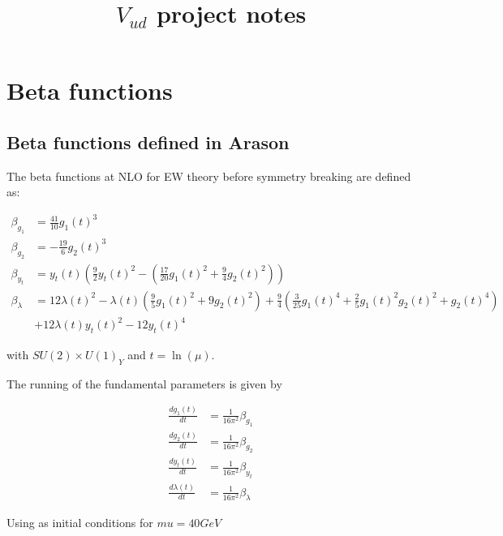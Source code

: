\documentclass[12pt]{article}
\title{$V_{ud}$ project notes}
\author{}
\date{}
\begin{document}
\maketitle

\section{Beta functions}
\subsection{Beta functions defined in Arason}

The beta functions at NLO for EW theory before symmetry breaking are defined as:

\begin{align*}
  \beta_{g_1} &= \frac{41}{10} g_1(t)^3 \\
  \beta_{g_2} &= -\frac{19}{6} g_2(t)^3 \\
  \beta_{y_t} &= y_t(t) \left( \frac{9}{2} y_t(t)^2 - \left( \frac{17}{20} g_1(t)^2 + \frac{9}{4} g_2(t)^2 \right) \right) \\
  \beta_{\lambda} &= 12 \lambda(t)^2 - \lambda(t) \left( \frac{9}{5} g_1(t)^2 + 9 g_2(t)^2 \right) + \frac{9}{4} \left( \frac{3}{25} g_1(t)^4 + \frac{2}{5} g_1(t)^2 g_2(t)^2 + g_2(t)^4 \right) \\
  &+ 12 \lambda(t) y_t(t)^2 - 12 y_t(t)^4
\end{align*}

with $SU(2) \times U(1)_Y$ and $t=\ln(\mu)$.


The running of the fundamental parameters is given by

\begin{align*}
  \frac{d g_1(t)}{dt} &= \frac{1}{16\pi^2} \beta_{g_1} \\
  \frac{d g_2(t)}{dt} &= \frac{1}{16\pi^2} \beta_{g_2} \\
  \frac{d y_t(t)}{dt} &= \frac{1}{16\pi^2} \beta_{y_t} \\
  \frac{d \lambda(t)}{dt} &= \frac{1}{16\pi^2} \beta_{\lambda}
\end{align*}

Using as initial conditions for $mu=40GeV$
\end{document}
